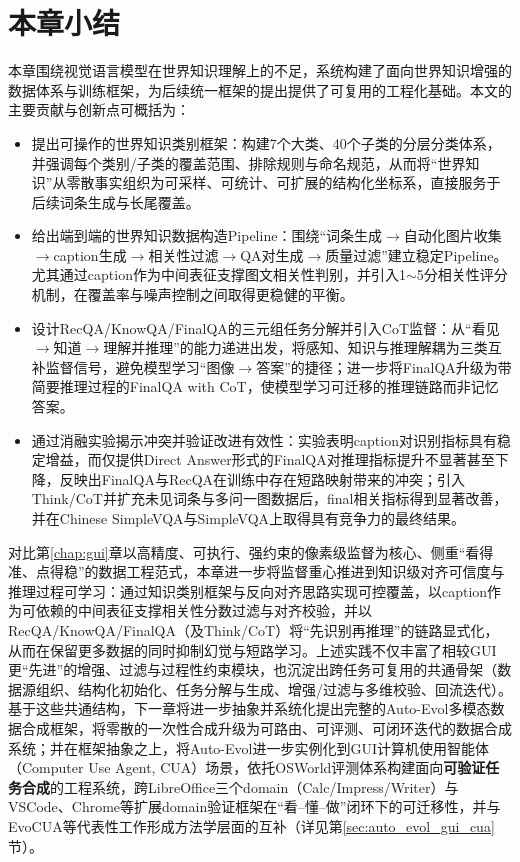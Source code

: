 \section{本章小结}
本章围绕视觉语言模型在世界知识理解上的不足，系统构建了面向世界知识增强的数据体系与训练框架，为后续统一框架的提出提供了可复用的工程化基础。本文的主要贡献与创新点可概括为：
\begin{itemize}
  \item 提出可操作的世界知识类别框架：构建7个大类、40个子类的分层分类体系，并强调每个类别/子类的覆盖范围、排除规则与命名规范，从而将“世界知识”从零散事实组织为可采样、可统计、可扩展的结构化坐标系，直接服务于后续词条生成与长尾覆盖。
  \item 给出端到端的世界知识数据构造Pipeline：围绕“词条生成$\rightarrow$自动化图片收集$\rightarrow$caption生成$\rightarrow$相关性过滤$\rightarrow$QA对生成$\rightarrow$质量过滤”建立稳定Pipeline。尤其通过caption作为中间表征支撑图文相关性判别，并引入1$\sim$5分相关性评分机制，在覆盖率与噪声控制之间取得更稳健的平衡。
  \item 设计RecQA/\allowbreak KnowQA/\allowbreak FinalQA的三元组任务分解并引入CoT监督：从“看见$\rightarrow$知道$\rightarrow$理解并推理”的能力递进出发，将感知、知识与推理解耦为三类互补监督信号，避免模型学习“图像$\rightarrow$答案”的捷径；进一步将FinalQA升级为带简要推理过程的FinalQA with CoT，使模型学习可迁移的推理链路而非记忆答案。
  \item 通过消融实验揭示冲突并验证改进有效性：实验表明caption对识别指标具有稳定增益，而仅提供Direct Answer形式的FinalQA对推理指标提升不显著甚至下降，反映出FinalQA与RecQA在训练中存在短路映射带来的冲突；引入Think/CoT并扩充未见词条与多问一图数据后，final相关指标得到显著改善，并在Chinese SimpleVQA与SimpleVQA上取得具有竞争力的最终结果。
\end{itemize}

对比第\ref{chap:gui}章以高精度、可执行、强约束的像素级监督为核心、侧重“看得准、点得稳”的数据工程范式，本章进一步将监督重心推进到知识级对齐可信度与推理过程可学习：通过知识类别框架与反向对齐思路实现可控覆盖，以caption作为可依赖的中间表征支撑相关性分数过滤与对齐校验，并以RecQA/\allowbreak KnowQA/\allowbreak FinalQA（及Think/CoT）将“先识别再推理”的链路显式化，从而在保留更多数据的同时抑制幻觉与短路学习。上述实践不仅丰富了相较GUI更“先进”的增强、过滤与过程性约束模块，也沉淀出跨任务可复用的共通骨架（数据源组织、结构化初始化、任务分解与生成、增强/过滤与多维校验、回流迭代）。基于这些共通结构，下一章将进一步抽象并系统化提出完整的Auto-Evol多模态数据合成框架，将零散的一次性合成升级为可路由、可评测、可闭环迭代的数据合成系统；并在框架抽象之上，将Auto-Evol进一步实例化到GUI计算机使用智能体（Computer Use Agent, CUA）场景，依托OSWorld评测体系\citep{xie2024osworld}构建面向\textbf{可验证任务合成}的工程系统，跨LibreOffice三个domain（Calc/\allowbreak Impress/\allowbreak Writer）与VSCode、Chrome等扩展domain验证框架在“看--懂--做”闭环下的可迁移性，并与EvoCUA\citep{xue2026evocua}等代表性工作形成方法学层面的互补（详见第\ref{sec:auto_evol_gui_cua}节）。
